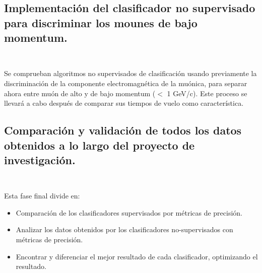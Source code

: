 \subsection{Implementación del clasificador no supervisado para discriminar los mounes de bajo momentum.\\ \\}

Se comprueban algoritmos no supervisados de clasificación usando previamente la discriminación de la componente electromagnética de la muónica, para separar ahora entre muón de alto y de bajo momentum ($<$ 1 GeV/c). Este proceso se llevará a cabo después de comparar sus tiempos de vuelo como característica.  \\



\subsection{Comparación y validación de todos los datos obtenidos a lo largo del proyecto de investigación.\\ \\ }

Esta fase final divide en:

\begin{itemize}
    \item Comparación de los clasificadores supervisados por métricas de precisión.
    \item Analizar los datos obtenidos por los clasificadores no-supervisados con métricas de precisión.
    \item Encontrar y diferenciar el mejor resultado de cada clasificador, optimizando el resultado.
\end{itemize}

